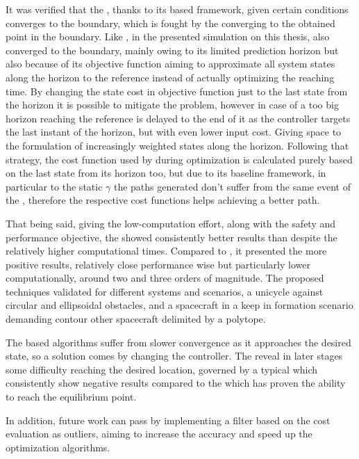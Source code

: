 It was verified that the , thanks to its based framework, given certain conditions converges to the boundary, which is fought by the  converging to the obtained point in the boundary. Like , in the presented simulation on this thesis,  also converged to the boundary, mainly owing to its limited prediction horizon but also because of its objective function aiming to approximate all system states along the horizon to the reference instead of actually optimizing the reaching time. By changing the state cost in objective function just to the last state from the horizon it is possible to mitigate the problem, however in case of a too big horizon reaching the reference is delayed to the end of it as the controller targets the last instant of the horizon, but with even lower input cost. Giving space to the formulation of increasingly weighted states along the horizon. Following that strategy, the cost function used by  during optimization is calculated purely based on the last state from its horizon too, but due to its baseline framework, in particular to the static \(\gamma\) the paths generated don't suffer from the same event of the , therefore the respective cost functions helps achieving a better path.       

That being said, giving the low-computation effort, along with the safety and performance objective, the  showed consistently better results than  despite the relatively higher computational times. Compared to , it presented the more positive results, relatively close performance wise but particularly lower computationally, around two and three orders of magnitude. The proposed techniques validated for different systems and scenarios, a unicycle against circular and ellipsoidal obstacles, and a spacecraft in a keep in formation scenario demanding contour other spacecraft delimited by a polytope.  

The  based algorithms suffer from slower convergence as it approaches the desired state, so a solution comes by changing the controller. The  reveal in later stages some difficulty reaching the desired location, governed by a typical  which consistently show negative results compared to the  which has proven the ability to reach the equilibrium point.

In addition, future work can pass by implementing a filter based on the cost evaluation as outliers, aiming to increase the accuracy and speed up the optimization algorithms.

